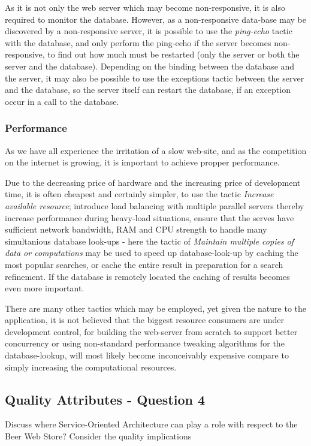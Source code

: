 As it is not only the web server which may become non-responsive, it is also required to monitor the database. However, as a non-responsive data-base may be discovered by a non-responsive server, it is possible to use the \emph{ping-echo} tactic with the database, and only perform the ping-echo if the server becomes non-responsive, to find out how much must be restarted (only the server or both the server and the database). 
Depending on the binding between the database and the server, it may also be possible to use the exceptions tactic between the server and the database, so the server itself can restart the database, if an exception occur in a call to the database. 

\subsubsection{Performance}

As we have all experience the irritation of a slow web-site, and as the competition on the internet is growing, it is important to achieve propper performance.

Due to the decreasing price of hardware and the increasing price of development time, it is often cheapest and certainly simpler, to use the tactic \emph{Increase available resource}; introduce load balancing with multiple parallel servers thereby increase performance during heavy-load situations, ensure that the serves have sufficient network bandwidth, RAM and CPU strength to handle many simultanious database look-ups - here the tactic of \emph{Maintain multiple copies of data or computations} may be used to speed up database-look-up by caching the most popular searches, or cache the entire result in preparation for a search refinement. If the database is remotely located the caching of results becomes even more important.

There are many other tactics which may be employed, yet given the nature to the application, it is not believed that the biggest resource consumers are under development control, for building the web-server from scratch to support better concurrency or using non-standard performance tweaking algorithms for the database-lookup, will most likely become inconceivably expensive compare to simply increasing the computational resources.

\subsection{Quality Attributes - Question 4}
\label{sec:qa_q4}
\begin{question}
Discuss where Service-Oriented Architecture can play a role
with respect to the Beer Web Store? Consider the quality implications
\end{question}

